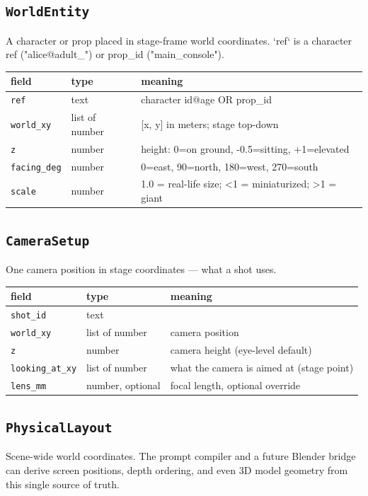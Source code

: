 \subsection*{\texttt{WorldEntity}}
\noindent A character or prop placed in stage-frame world coordinates. `ref` is a character ref ("alice@adult\_") or prop\_\allowbreak id ("main\_\allowbreak console").

\begin{longtable}{@{}R{0.24\textwidth}R{0.21\textwidth}R{0.49\textwidth}@{}}
\toprule \textbf{field} & \textbf{type} & \textbf{meaning} \\ \midrule
\endhead
\texttt{ref} & text & character id@age OR prop\_\allowbreak id \\
\texttt{world\_\allowbreak xy} & list of number & [x, y] in meters; stage top-down \\
\texttt{z} & number & height: 0=on ground, -0.5=sitting, +1=elevated \\
\texttt{facing\_\allowbreak deg} & number & 0=east, 90=north, 180=west, 270=south \\
\texttt{scale} & number & 1.0 = real-life size; <1 = miniaturized; >1 = giant \\
\bottomrule
\end{longtable}

\subsection*{\texttt{CameraSetup}}
\noindent One camera position in stage coordinates ---\allowbreak{} what a shot uses.

\begin{longtable}{@{}R{0.24\textwidth}R{0.21\textwidth}R{0.49\textwidth}@{}}
\toprule \textbf{field} & \textbf{type} & \textbf{meaning} \\ \midrule
\endhead
\texttt{shot\_\allowbreak id} & text &  \\
\texttt{world\_\allowbreak xy} & list of number & camera position \\
\texttt{z} & number & camera height (eye-level default) \\
\texttt{looking\_\allowbreak at\_\allowbreak xy} & list of number & what the camera is aimed at (stage point) \\
\texttt{lens\_\allowbreak mm} & number, optional & focal length, optional override \\
\bottomrule
\end{longtable}

\subsection*{\texttt{PhysicalLayout}}
\noindent Scene-wide world coordinates. The prompt compiler and a future Blender bridge can derive screen positions, depth ordering, and even 3D model geometry from this single source of truth.

